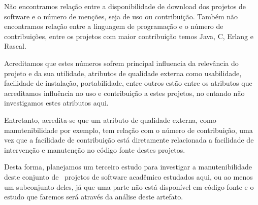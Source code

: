 Não encontramos relação entre a disponibilidade de download dos projetos de software
e o número de menções, seja de uso ou contribuição. Também não encontramos relação
entre a linguagem de programação e o número de contribuições, entre os projetos com
maior contribuição temos Java, C, Erlang e Rascal.

Acreditamos que estes números sofrem principal influencia da relevância do
projeto e da sua utilidade, atributos de qualidade externa como usabilidade,
facilidade de instalação, portabilidade, entre outros estão entre os atributos
que acreditamos influência no uso e contribuição a estes projetos, no entando
não investigamos estes atributos aqui.

Entretanto, acredita-se que um atributo de qualidade externa, como
manutenibilidade por exemplo, tem relação com o número de contribuição, uma vez
que a facilidade de contribuição está diretamente relacionada a facilidade de
intervenção e manutenção no código fonte destes projetos.

Desta forma, planejamos um terceiro estudo para investigar a manutenibilidade
deste conjunto de \SoftwareCount \ projetos de software acadêmico estudados aqui,
ou ao menos um subconjunto deles, já que uma parte não está disponível em
código fonte e o estudo que faremos será através da análise deste artefato.

%



%
%
%
%
%
%

